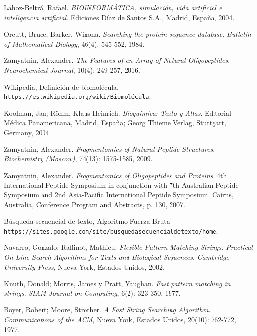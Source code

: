 \documentclass[letterpaper, 10pt, notitlepage]{report}
\begin{document}
\begin{thebibliography}{9}

Lahoz-Beltrá, Rafael.
\textit{BIOINFORMÁTICA, simulación, vida artificial e inteligencia artificial}. 
Ediciones Díaz de Santos S.A., Madrid, España, 2004.

Orcutt, Bruce; Barker, Winona.
\textit{Searching the protein sequence database}.
\textit{Bulletin of Mathematical Biology}, 46(4): 545-552, 1984.

Zamyatnin, Alexander.
\textit{The Features of an Array of Natural Oligopeptides}.
\textit{Neurochemical Journal}, 10(4): 249-257, 2016.

Wikipedia, Definición de biomolécula.
\\\texttt{https://es.wikipedia.org/wiki/Biomolécula}.

Koolman, Jan; Röhm, Klaus-Heinrich.
\textit{Bioquímica: Texto y Atlas}.
Editorial Médica Panamericana, Madrid, España;
Georg Thieme Verlag, Stuttgart, Germany, 2004.

Zamyatnin, Alexander.
\textit{Fragmentomics of Natural Peptide Structures}. 
\textit{Biochemistry (Moscow)}, 74(13): 1575-1585, 2009.

Zamyatnin, Alexander.
\textit{Fragmentomics of Oligopeptides and Proteins}. 
4th International Peptide Symposium in conjunction with 7th Australian Peptide Symposium and 2nd Asia-Pacific International Peptide Symposium. Cairns, Australia, Conference Program and Abstracts, p. 130, 2007.

Búsqueda secuencial de texto, Algoritmo Fuerza Bruta.
\\\texttt{https://sites.google.com/site/busquedasecuencialdetexto/home}.

Navarro, Gonzalo; Raffinot, Mathieu.
\textit{Flexible Pattern Matching Strings: Practical On-Line Search Algorithms for Texts and Biological Sequences}.
\textit{Cambridge University Press}, Nueva York, Estados Unidos, 2002.

Knuth, Donald; Morris, James y Pratt, Vaughan.
\textit{Fast pattern matching in strings}.
\textit{SIAM Journal on Computing}, 6(2): 323-350, 1977.

Boyer, Robert; Moore, Strother.
\textit{A Fast String Searching Algorithm}.
\textit{Communications of the ACM}, Nueva York, Estados Unidos, 20(10): 762-772, 1977.


\end{thebibliography}
\end{document}
